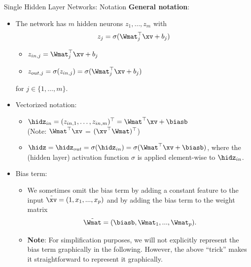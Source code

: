 \begin{vbframe}{Single Hidden Layer Networks: Notation}
  \textbf{General notation}:
  \begin{itemize}
    \vspace{4mm}
    \item The network has $m$ hidden neurons $z_1, \dots, z_m$ with
    $$ z_j = \sigma(\Wmat_j^\top \xv + b_j)$$
    \vspace{-0.5cm}
    \begin{itemize}
    \item $z_{in,j}  = \Wmat_j^\top \xv + b_j$
    \vspace{2mm}
    \item $z_{out,j} = \sigma(z_{in,j}) = \sigma(\Wmat_j^\top \xv + b_j)$
    \end{itemize}
    \vspace{4mm}
    for $j \in \{1,\ldots,m\}$.
    \vspace{4mm}
    \framebreak 

\item Vectorized notation:
\begin{itemize}
\item $ \hidz_{in} = (z_{in,1}, \dots, z_{in,m})^\top = \Wmat^\top \xv + \biasb$ \\ (Note: $\Wmat^\top \xv$ = $(\xv^\top \Wmat)^\top$)
\item $ \hidz = \hidz_{out} = \sigma(\hidz_{in}) = \sigma(\Wmat^\top \xv + \biasb)$, where the (hidden layer) activation function $\sigma$ is applied element-wise to $\hidz_{in}$.  
\end{itemize}
\item Bias term:         
\begin{itemize}
\item We sometimes omit the bias term by adding a constant feature to the input $\tilde{\xv} = (1, x_1, ..., x_p)$ and by adding the bias term to the weight matrix 
$$\tilde{\Wmat} = (\biasb, \Wmat_1, ..., \Wmat_p).$$ 
\item \textbf{Note}: For simplification purposes, we will not explicitly represent the bias term graphically in the following. However, the above \enquote{trick} makes it straightforward to represent it graphically. 
\end{itemize}
\end{itemize}
\framebreak


\end{vbframe}
